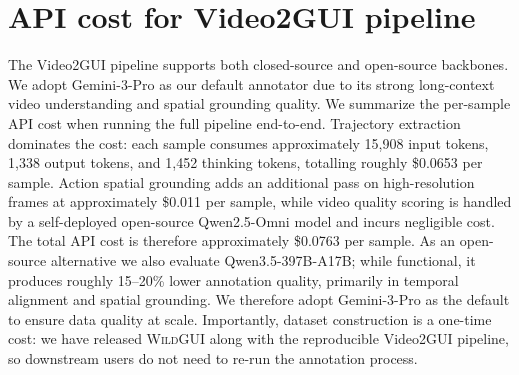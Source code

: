 \documentclass{llmxive}
\providecommand{\ourdataset}{\textsc{WildGUI}\xspace}
\begin{document}
\section{API cost for Video2GUI pipeline}
\label{sec: pipeline cost}

The Video2GUI pipeline supports both closed-source and open-source backbones. We adopt Gemini-3-Pro as our default annotator due to its strong long-context video understanding and spatial grounding quality. We summarize the per-sample API cost when running the full pipeline end-to-end. Trajectory extraction dominates the cost: each sample consumes approximately 15{,}908 input tokens, 1{,}338 output tokens, and 1{,}452 thinking tokens, totalling roughly \$0.0653 per sample. Action spatial grounding adds an additional pass on high-resolution frames at approximately \$0.011 per sample, while video quality scoring is handled by a self-deployed open-source Qwen2.5-Omni model and incurs negligible cost. The total API cost is therefore approximately \$0.0763 per sample. As an open-source alternative we also evaluate Qwen3.5-397B-A17B; while functional, it produces roughly 15--20\% lower annotation quality, primarily in temporal alignment and spatial grounding. We therefore adopt Gemini-3-Pro as the default to ensure data quality at scale. Importantly, dataset construction is a one-time cost: we have released \ourdataset{} along with the reproducible Video2GUI pipeline, so downstream users do not need to re-run the annotation process.
\end{document}
